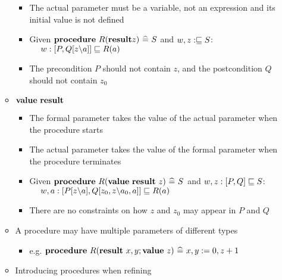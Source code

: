 \begin{itemize}
\begin{itemize}
\begin{itemize}
			\item The actual parameter must be a variable, not an expression and its initial value is not defined
			
			\item Given $ {\bf procedure} ~ R({\bf result} z) ~ \widehat{=} ~ S $ and $ w, z : \mathrel{\sqsubseteq} S $:\\
			$ ~~~~ w : [P, Q[z \backslash a]] \mathrel{\sqsubseteq} R(a) $
			
			\item The precondition $ P $ should not contain $ z $, and the postcondition $ Q $ should not contain $ z_0 $
			
		\end{itemize}
		
		\item $ {\bf value} ~ {\bf result} $
		
		\begin{itemize}
			
			\item The formal parameter takes the value of the actual parameter when the procedure starts
			
			\item The actual parameter takes the value of the formal parameter when the procedure terminates
			
			\item Given $ {\bf procedure} ~ R({\bf value} ~ {\bf result} ~ z) ~ \widehat{=} ~ S $ and $ w, z : [P, Q] \mathrel{\sqsubseteq} S $:\\
			$ ~~~~ w, a : [P[z \backslash a], Q[z_0, z \backslash a_0, a]] \mathrel{\sqsubseteq} R(a) $
			
			\item There are no constraints on how $ z $ and $ z_0 $ may appear in $ P $ and $ Q $
			
		\end{itemize}
	
		\item A procedure may have multiple parameters of different types
		
		\begin{itemize}
			
			\item e.g. $ {\bf procedure} ~ R({\bf result} ~ x, y; {\bf value} ~ z) ~ \widehat{=} ~ x, y := 0, z + 1 $
			
		\end{itemize}
		
		 
	
		\item Introducing procedures when refining
		
		\begin{enumerate}
			

\end{enumerate}
\end{itemize}
\end{itemize}
